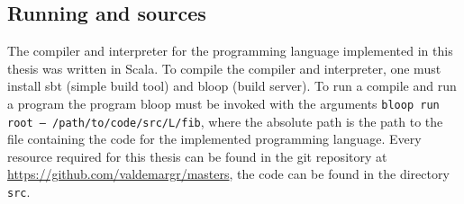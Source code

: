 \subsection{Running and sources}
The compiler and interpreter for the programming language implemented in this thesis was written in Scala.
To compile the compiler and interpreter, one must install sbt (simple build tool) and bloop (build server).
To run a compile and run a program the program bloop must be invoked with the arguments \texttt{bloop run root -- /path/to/code/src/L/fib}, where the absolute path is the path to the file containing the code for the implemented programming language.
Every resource required for this thesis can be found in the git repository at \url{https://github.com/valdemargr/masters}, the code can be found in the directory \texttt{src}.
